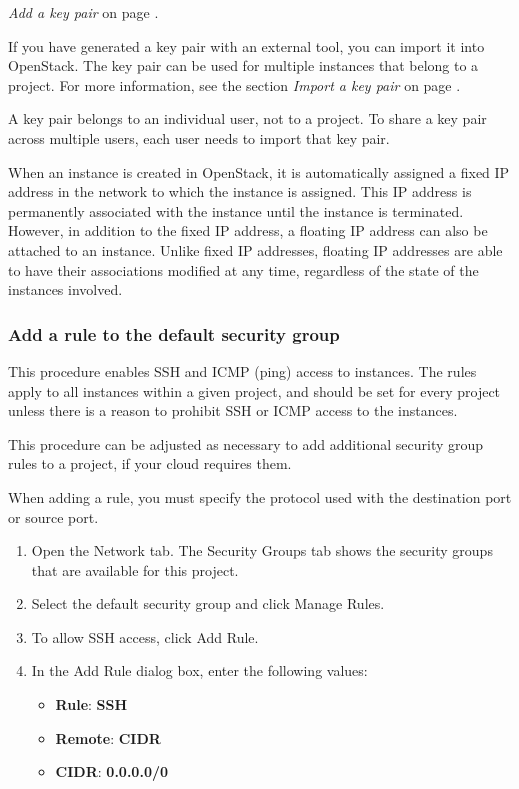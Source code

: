 {\emph{Add a key pair} on page \pageref{add-a-key-pair}.

If you have generated a key pair with an external tool, you can import
it into \gls{OpenStack}. The key pair can be used for multiple instances that
belong to a project. For more information, see the section
{\emph{Import a key pair}} on page \pageref{import-a-key-pair}.

 A key pair belongs to an individual user, not to a
project. To share a key pair across multiple users, each user needs to
import that key pair.

When an instance is created in \gls{OpenStack}, it is automatically assigned a
fixed IP address in the network to which the instance is assigned. This
IP address is permanently associated with the instance until the
instance is terminated. However, in addition to the fixed IP address, a
floating IP address can also be attached to an instance. Unlike fixed IP
addresses, floating IP addresses are able to have their associations
modified at any time, regardless of the state of the instances involved.

\subsubsection{Add a rule to the default security group}\label{add-a-rule-to-the-default-security-group}

This procedure enables SSH and ICMP (ping) access to instances. The
rules apply to all instances within a given project, and should be set
for every project unless there is a reason to prohibit SSH or ICMP
access to the instances.

This procedure can be adjusted as necessary to add additional security
group rules to a project, if your cloud requires them.

 When adding a rule, you must specify the protocol used
with the destination port or source port.

\begin{enumerate}
\item Open the Network tab. The Security Groups
  tab shows the security groups that are available for this project.
\item Select the default security group and click Manage Rules.
\item To allow SSH access, click Add Rule.
\item In the Add Rule dialog box, enter the following values:

  \begin{itemize}
  \item \textbf{Rule}: \textbf{SSH}
  \item \textbf{Remote}: \textbf{CIDR}
  \item \textbf{CIDR}: \textbf{0.0.0.0/0}
  \end{itemize}


\end{enumerate}}
